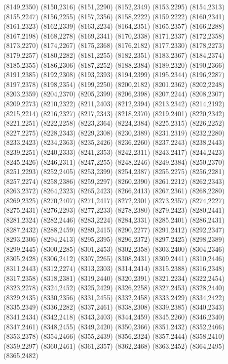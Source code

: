 (8149,2350)
(8150,2316)
(8151,2290)
(8152,2349)
(8153,2295)
(8154,2313)
(8155,2247)
(8156,2255)
(8157,2356)
(8158,2222)
(8159,2222)
(8160,2341)
(8161,2323)
(8162,2339)
(8163,2234)
(8164,2351)
(8165,2357)
(8166,2288)
(8167,2198)
(8168,2278)
(8169,2341)
(8170,2338)
(8171,2337)
(8172,2358)
(8173,2270)
(8174,2267)
(8175,2368)
(8176,2182)
(8177,2330)
(8178,2273)
(8179,2257)
(8180,2282)
(8181,2255)
(8182,2351)
(8183,2367)
(8184,2374)
(8185,2355)
(8186,2306)
(8187,2252)
(8188,2384)
(8189,2320)
(8190,2366)
(8191,2385)
(8192,2308)
(8193,2393)
(8194,2399)
(8195,2344)
(8196,2287)
(8197,2378)
(8198,2354)
(8199,2250)
(8200,2182)
(8201,2362)
(8202,2248)
(8203,2359)
(8204,2370)
(8205,2399)
(8206,2398)
(8207,2244)
(8208,2307)
(8209,2273)
(8210,2322)
(8211,2403)
(8212,2394)
(8213,2342)
(8214,2192)
(8215,2214)
(8216,2327)
(8217,2343)
(8218,2370)
(8219,2401)
(8220,2342)
(8221,2251)
(8222,2258)
(8223,2364)
(8224,2384)
(8225,2315)
(8226,2252)
(8227,2275)
(8228,2343)
(8229,2308)
(8230,2389)
(8231,2319)
(8232,2280)
(8233,2423)
(8234,2363)
(8235,2426)
(8236,2260)
(8237,2243)
(8238,2443)
(8239,2251)
(8240,2333)
(8241,2353)
(8242,2311)
(8243,2417)
(8244,2423)
(8245,2426)
(8246,2311)
(8247,2255)
(8248,2246)
(8249,2384)
(8250,2370)
(8251,2293)
(8252,2405)
(8253,2399)
(8254,2387)
(8255,2275)
(8256,2281)
(8257,2274)
(8258,2386)
(8259,2297)
(8260,2390)
(8261,2212)
(8262,2343)
(8263,2372)
(8264,2323)
(8265,2423)
(8266,2413)
(8267,2361)
(8268,2280)
(8269,2325)
(8270,2407)
(8271,2417)
(8272,2301)
(8273,2357)
(8274,2227)
(8275,2431)
(8276,2293)
(8277,2233)
(8278,2380)
(8279,2423)
(8280,2441)
(8281,2324)
(8282,2446)
(8283,2224)
(8284,2331)
(8285,2401)
(8286,2431)
(8287,2432)
(8288,2459)
(8289,2415)
(8290,2277)
(8291,2412)
(8292,2347)
(8293,2306)
(8294,2413)
(8295,2395)
(8296,2372)
(8297,2425)
(8298,2389)
(8299,2445)
(8300,2285)
(8301,2453)
(8302,2358)
(8303,2400)
(8304,2346)
(8305,2428)
(8306,2412)
(8307,2265)
(8308,2431)
(8309,2441)
(8310,2446)
(8311,2443)
(8312,2274)
(8313,2303)
(8314,2414)
(8315,2388)
(8316,2348)
(8317,2358)
(8318,2381)
(8319,2440)
(8320,2391)
(8321,2234)
(8322,2454)
(8323,2278)
(8324,2452)
(8325,2429)
(8326,2258)
(8327,2453)
(8328,2440)
(8329,2435)
(8330,2356)
(8331,2455)
(8332,2458)
(8333,2429)
(8334,2422)
(8335,2349)
(8336,2282)
(8337,2461)
(8338,2308)
(8339,2385)
(8340,2343)
(8341,2434)
(8342,2418)
(8343,2403)
(8344,2459)
(8345,2260)
(8346,2340)
(8347,2461)
(8348,2455)
(8349,2420)
(8350,2366)
(8351,2432)
(8352,2466)
(8353,2378)
(8354,2466)
(8355,2439)
(8356,2324)
(8357,2444)
(8358,2410)
(8359,2297)
(8360,2461)
(8361,2357)
(8362,2468)
(8363,2452)
(8364,2495)
(8365,2482)
